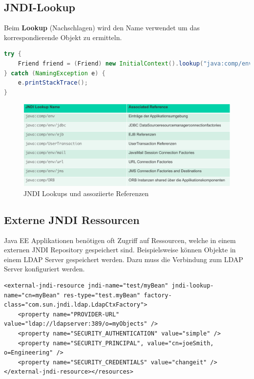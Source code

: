 \subsection{JNDI-Lookup}
Beim \textbf{Lookup} (Nachschlagen) wird den Name verwendet um das korrespondierende Objekt zu ermitteln. 

\begin{lstlisting}[language=Java, caption=Beispiel programmatischer EJB-Lookup]
try {
	Friend friend = (Friend) new InitialContext().lookup("java:comp/env/myFriend");
} catch (NamingException e) {
	e.printStackTrace();
}
\end{lstlisting}

\begin{figure}[h!]
\centering
\includegraphics[width=0.7\linewidth]{fig/jndi-lookups}
\caption{JNDI Lookups und assoziierte Referenzen}
\label{fig:jndi-lookups}
\end{figure}

\subsection{Externe JNDI Ressourcen}
Java EE Applikationen benötigen oft Zugriff auf Ressourcen, welche in einem externen JNDI Repository gespeichert sind. Beispielsweise können Objekte in einem LDAP Server gespeichert werden. Dazu muss die Verbindung zum LDAP Server konfiguriert werden.

\begin{lstlisting}
<external-jndi-resource jndi-name="test/myBean" jndi-lookup-name="cn=myBean" res-type="test.myBean" factory-class="com.sun.jndi.ldap.LdapCtxFactory">
	<property name="PROVIDER-URL" value="ldap://ldapserver:389/o=myObjects" />
	<property name="SECURITY_AUTHENTICATION" value="simple" />
	<property name="SECURITY_PRINCIPAL", value="cn=joeSmith, o=Engineering" />
	<property name="SECURITY_CREDENTIALS" value="changeit" />
</external-jndi-resource></resources>
\end{lstlisting}

